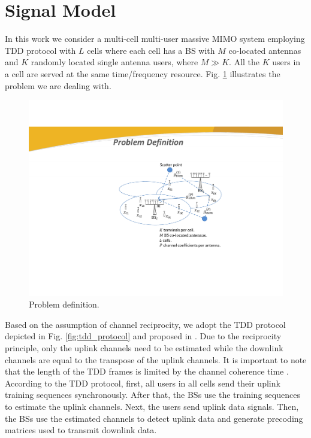 \documentclass[10pt,journal,comsoc,final]{IEEEtran}
\begin{document}
\section{Signal Model}
In this work we consider a multi-cell multi-user massive MIMO system employing TDD protocol with $L$ cells where each cell has a BS with $M$ co-located  antennas and $K$ randomly located single antenna users, where $M \gg K$. All the $K$ users in a cell are served at the same time/frequency resource. Fig. \ref{fig:problem_definition} illustrates the problem we are dealing with.

\begin{figure}[b]
\centering
\vspace{-4mm}
\includegraphics[trim = 0mm 0mm 0mm 0mm, clip=true, scale=0.63]{cropped_problem_definition.pdf}
\caption{Problem definition.}
\label{fig:problem_definition}
\end{figure}

Based on the assumption of channel reciprocity, we adopt the TDD protocol depicted in Fig. \ref{fig:tdd_protocol} and proposed in \cite{marzetta:how_much_training}. Due to the reciprocity principle, only the uplink channels need to be estimated while the downlink channels are equal to the transpose of the uplink channels. It is important to note that the length of the TDD frames is limited by the channel coherence time \cite{marzetta:how_much_training, caire:achivable_dl_rates}. According to the TDD protocol, first, all users in all cells send their uplink training sequences synchronously. After that, the BSs use the training sequences to estimate the uplink channels. Next, the users send uplink data signals. Then, the BSs use the estimated channels to detect uplink data and generate precoding matrices used to transmit downlink data.
\end{document}
